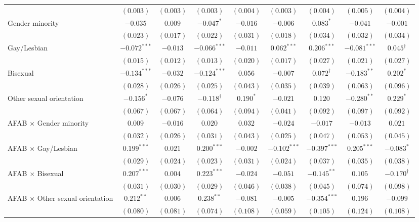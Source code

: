 \begin{table}[htpb]
{\begin{tabular}{l c c c c c c c c}
 & $(0.003)$ & $(0.003)$ & $(0.003)$ & $(0.004)$ & $(0.003)$ & $(0.004)$ & $(0.005)$ & $(0.004)$ \\
Gender minority & $-0.035$ & $0.009$ & $-0.047^{*}$ & $-0.016$ & $-0.006$ & $0.083^{*}$ & $-0.041$ & $-0.001$ \\
 & $(0.023)$ & $(0.017)$ & $(0.022)$ & $(0.031)$ & $(0.018)$ & $(0.034)$ & $(0.032)$ & $(0.034)$ \\
Gay/Lesbian & $-0.072^{***}$ & $-0.013$ & $-0.066^{***}$ & $-0.011$ & $0.062^{***}$ & $0.206^{***}$ & $-0.081^{***}$ & $0.045^{\dagger}$ \\
 & $(0.015)$ & $(0.012)$ & $(0.013)$ & $(0.020)$ & $(0.017)$ & $(0.027)$ & $(0.021)$ & $(0.027)$ \\
Bisexual & $-0.134^{***}$ & $-0.032$ & $-0.124^{***}$ & $0.056$ & $-0.007$ & $0.072^{\dagger}$ & $-0.183^{**}$ & $0.202^{*}$ \\
 & $(0.028)$ & $(0.026)$ & $(0.025)$ & $(0.043)$ & $(0.035)$ & $(0.039)$ & $(0.063)$ & $(0.096)$ \\
Other sexual orientation & $-0.156^{*}$ & $-0.076$ & $-0.118^{\dagger}$ & $0.190^{*}$ & $-0.021$ & $0.120$ & $-0.280^{**}$ & $0.229^{*}$ \\
 & $(0.067)$ & $(0.067)$ & $(0.064)$ & $(0.094)$ & $(0.041)$ & $(0.092)$ & $(0.097)$ & $(0.092)$ \\
AFAB $\times$ Gender minority & $0.009$ & $-0.016$ & $0.020$ & $0.032$ & $-0.024$ & $-0.017$ & $-0.013$ & $0.021$ \\
 & $(0.032)$ & $(0.026)$ & $(0.031)$ & $(0.043)$ & $(0.025)$ & $(0.047)$ & $(0.053)$ & $(0.045)$ \\
AFAB $\times$ Gay/Lesbian & $0.199^{***}$ & $0.021$ & $0.200^{***}$ & $-0.002$ & $-0.102^{***}$ & $-0.397^{***}$ & $0.205^{***}$ & $-0.083^{*}$ \\
 & $(0.029)$ & $(0.024)$ & $(0.023)$ & $(0.031)$ & $(0.024)$ & $(0.037)$ & $(0.035)$ & $(0.038)$ \\
AFAB $\times$ Bisexual & $0.207^{***}$ & $0.004$ & $0.223^{***}$ & $-0.024$ & $-0.051$ & $-0.145^{**}$ & $0.105$ & $-0.170^{\dagger}$ \\
 & $(0.031)$ & $(0.030)$ & $(0.029)$ & $(0.046)$ & $(0.038)$ & $(0.045)$ & $(0.074)$ & $(0.098)$ \\
AFAB $\times$ Other sexual orientation & $0.212^{**}$ & $0.006$ & $0.238^{**}$ & $-0.081$ & $-0.005$ & $-0.354^{***}$ & $0.196$ & $-0.099$ \\
 & $(0.080)$ & $(0.081)$ & $(0.074)$ & $(0.108)$ & $(0.059)$ & $(0.105)$ & $(0.124)$ & $(0.108)$ \\

\end{tabular}}
\end{table}
